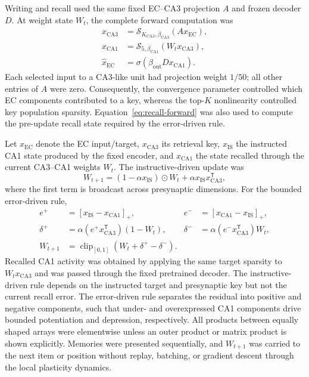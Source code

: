 Writing and recall used the same fixed EC--CA3 projection $A$ and frozen
decoder $D$. At weight state $W_t$, the complete forward computation was
\begin{align}
x_{\mathrm{CA3}} &=
 \mathcal{S}_{K_{\mathrm{CA3}},\beta_{\mathrm{CA3}}}
 (A x_{\mathrm{EC}}),\\
x_{\mathrm{CA1}} &=
 \mathcal{S}_{5,\beta_{\mathrm{CA1}}}(W_t x_{\mathrm{CA3}}),\\
\widehat{x}_{\mathrm{EC}} &=
 \sigma(\beta_{\mathrm{out}}D x_{\mathrm{CA1}}).
\label{eq:recall-forward}
\end{align}
Each selected input to a CA3-like unit had projection weight $1/50$; all other
entries of $A$ were zero. Consequently, the convergence parameter controlled
which EC components contributed to a key, whereas the top-$K$ nonlinearity
controlled key population sparsity. Equation~\ref{eq:recall-forward} was also
used to compute the pre-update recall state required by the error-driven rule.

Let $x_{\mathrm{EC}}$ denote the EC input/target,
$x_{\mathrm{CA3}}$ its retrieval key, $x_{\mathrm{IS}}$ the instructed CA1
state produced by the fixed encoder, and $x_{\mathrm{CA1}}$ the state recalled
through the current CA3--CA1 weights $W_t$. The instructive-driven update was
\begin{equation}
W_{t+1} =
  (1-\alpha x_{\mathrm{IS}})\odot W_t
  + \alpha x_{\mathrm{IS}}x_{\mathrm{CA3}}^{\mathsf T},
\label{eq:instructive-driven-rule}
\end{equation}
where the first term is broadcast across presynaptic dimensions. For the
bounded error-driven rule,
\begin{align}
e^+ &= [x_{\mathrm{IS}}-x_{\mathrm{CA1}}]_+, &
e^- &= [x_{\mathrm{CA1}}-x_{\mathrm{IS}}]_+,\\
\delta^+ &= \alpha(e^+x_{\mathrm{CA3}}^{\mathsf T})(1-W_t), &
\delta^- &= \alpha(e^-x_{\mathrm{CA3}}^{\mathsf T})W_t,\\
W_{t+1} &= \operatorname{clip}_{[0,1]}
           (W_t+\delta^+-\delta^-).
\label{eq:error-driven-rule}
\end{align}
Recalled CA1 activity was obtained by applying the same target sparsity to
$W_tx_{\mathrm{CA3}}$ and was passed through the fixed pretrained decoder.
The instructive-driven rule depends on the instructed target and presynaptic key but not
the current recall error. The error-driven rule separates the residual into
positive and negative components, such that under- and overexpressed CA1
components drive bounded potentiation and depression, respectively.
All products between equally shaped arrays were elementwise unless an outer
product or matrix product is shown explicitly. Memories were presented
sequentially, and $W_{t+1}$ was carried to the next item or position without
replay, batching, or gradient descent through the local plasticity dynamics.

